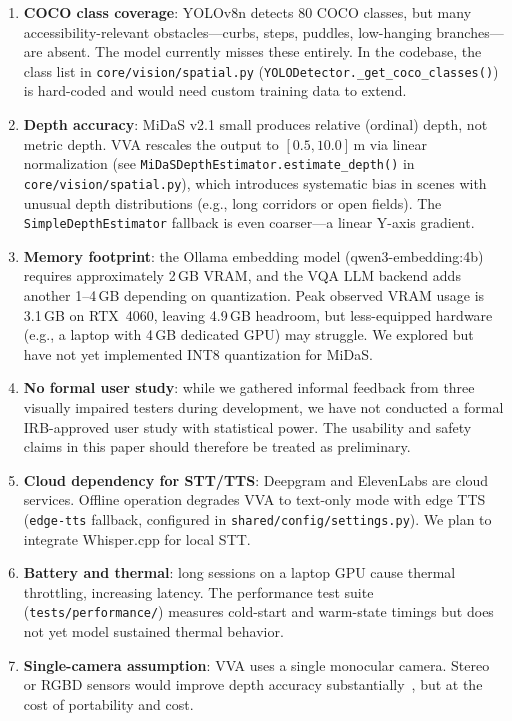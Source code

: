 \begin{enumerate}
    \item \textbf{COCO class coverage}: YOLOv8n detects 80 COCO classes, but many accessibility-relevant obstacles---curbs, steps, puddles, low-hanging branches---are absent. The model currently misses these entirely. In the codebase, the class list in \texttt{core/vision/spatial.py} (\texttt{YOLODetector.\_get\_coco\_classes()}) is hard-coded and would need custom training data to extend.

    \item \textbf{Depth accuracy}: MiDaS v2.1 small produces relative (ordinal) depth, not metric depth. VVA rescales the output to $[0.5, 10.0]$\,m via linear normalization (see \texttt{MiDaSDepthEstimator.estimate\_depth()} in \texttt{core/vision/spatial.py}), which introduces systematic bias in scenes with unusual depth distributions (e.g., long corridors or open fields). The \texttt{SimpleDepthEstimator} fallback is even coarser---a linear Y-axis gradient.

    \item \textbf{Memory footprint}: the Ollama embedding model (qwen3-embedding:4b) requires approximately 2\,GB VRAM, and the VQA LLM backend adds another 1--4\,GB depending on quantization. Peak observed VRAM usage is 3.1\,GB on RTX~4060, leaving 4.9\,GB headroom, but less-equipped hardware (e.g., a laptop with 4\,GB dedicated GPU) may struggle. We explored but have not yet implemented INT8 quantization for MiDaS.

    \item \textbf{No formal user study}: while we gathered informal feedback from three visually impaired testers during development, we have not conducted a formal IRB-approved user study with statistical power. The usability and safety claims in this paper should therefore be treated as preliminary.

    \item \textbf{Cloud dependency for STT/TTS}: Deepgram and ElevenLabs are cloud services. Offline operation degrades VVA to text-only mode with edge TTS (\texttt{edge-tts} fallback, configured in \texttt{shared/config/settings.py}). We plan to integrate Whisper.cpp for local STT.

    \item \textbf{Battery and thermal}: long sessions on a laptop GPU cause thermal throttling, increasing latency. The performance test suite (\texttt{tests/performance/}) measures cold-start and warm-state timings but does not yet model sustained thermal behavior.

    \item \textbf{Single-camera assumption}: VVA uses a single monocular camera. Stereo or RGBD sensors would improve depth accuracy substantially~\cite{obstacle_avoidance_uav_depth2022}, but at the cost of portability and cost.
\end{enumerate}

